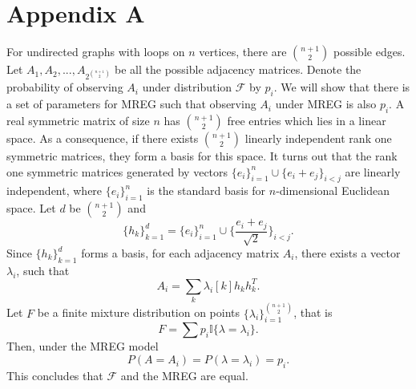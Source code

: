 \documentclass[10pt,journal,compsoc]{IEEEtran}
\newenvironment{proof}[1][Proof]{\begin{trivlist}
		\item[\hskip \labelsep {\bfseries #1}]}{\end{trivlist}}
\begin{document}
\section*{Appendix A}

\begin{proof} [Proof of Theorem 2.1]
 For undirected graphs with loops on $n$ vertices, there are ${n+1}\choose{2}$ possible edges. Let $A_1,A_2,...,A_{2^{{n+1}\choose{2}}}$ be all the possible adjacency matrices. Denote the probability of observing $A_i$ under distribution $\mathcal{F}$ by $p_i$. We will show that there is a set of parameters for MREG such that observing $A_i$ under MREG is also $p_i$. 
 A real symmetric matrix of size $n$ has ${n+1}\choose{2}$ free entries which lies in a linear space. As a consequence, if there exists ${n+1}\choose{2}$ linearly independent rank one symmetric matrices, they form a basis for this space. It turns out that the rank one symmetric matrices generated by vectors $\{e_i\}_{i=1}^{n} \cup \{e_i+e_j\}_{i<j}$ are linearly independent, where $\{e_i\}_{i=1}^{n}$ is the standard basis for $n$-dimensional Euclidean space.
 Let $d$ be ${n+1}\choose{2} $  and 
 \[\{h_k\}_{k=1}^d = \{e_i\}_{i=1}^{n} \cup \{\frac{e_i+e_j}{\sqrt{2}}\}_{i<j}.\] 
 Since $\{h_k\}_{k=1}^d$ forms a basis, for each adjacency matrix $A_i$, there exists a vector $\lambda_i$, such that 
 \[A_i =\sum_{k} \lambda_i [k] h_k  h_k^T.\] Let $F$ be a finite mixture distribution on points $\{\lambda_i\}_{i=1}^{{n+1}\choose{2}}$, that is 
 \[F = \sum p_i \mathbb{I} \{\lambda = \lambda_i\}.\]
  Then, under the MREG model
 \[P(A=A_i) = P(\lambda = \lambda_i) = p_i .\]
 This concludes that $\mathcal{F}$ and the MREG are equal.
 \end{proof}
\end{document}
